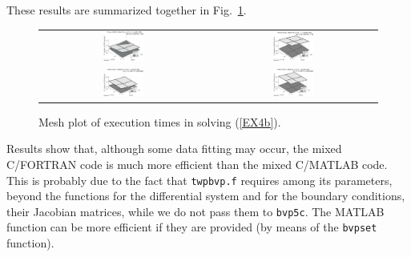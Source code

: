 \documentclass[a4paper,10pt]{report}%
\begin{document}
These results are summarized together in Fig.~\ref{EX4b_times3D_tol4}.
\begin{figure}[htb]
\centering
\begin{tabular}{cc}
\includegraphics[width=0.25\textwidth]{./FIGS/EX4b/EX4b_times3D_tol4_1.eps} &
\includegraphics[width=0.25\textwidth]{./FIGS/EX4b/EX4b_times3D_tol4_3.eps} \\
\includegraphics[width=0.25\textwidth]{./FIGS/EX4b/EX4b_times3D_tol4_2.eps} &
\includegraphics[width=0.25\textwidth]{./FIGS/EX4b/EX4b_times3D_tol4_4.eps}
\end{tabular}
\caption{\small Mesh plot of execution times in solving (\ref{EX4b}).}
\label{EX4b_times3D_tol4}
\end{figure}

\noindent Results show that, although some data fitting may occur, the mixed C/FORTRAN code is much more
efficient than the mixed C/MATLAB code.
This is probably due to the fact that {\tt twpbvp.f} requires among its parameters, beyond the functions for the
differential system and for the boundary conditions, their Jacobian matrices, while we do not pass them to
{\tt bvp5c}. The MATLAB function can be more efficient if they are provided (by means of the {\tt bvpset}
function).
\end{document}
